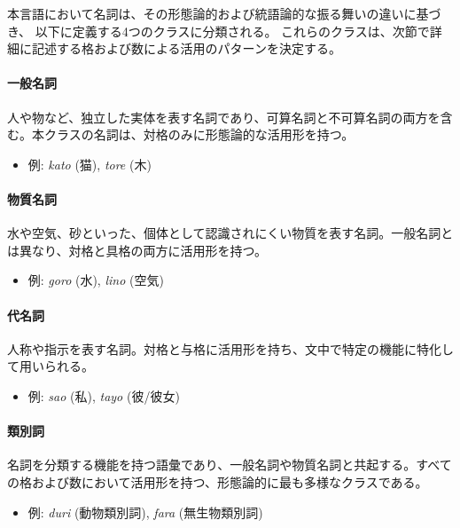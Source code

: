 本言語において名詞は、その形態論的および統語論的な振る舞いの違いに基づき、
以下に定義する4つのクラスに分類される。
これらのクラスは、次節で詳細に記述する格および数による活用のパターンを決定する。

\paragraph{一般名詞}
人や物など、独立した実体を表す名詞であり、可算名詞と不可算名詞の両方を含む。本クラスの名詞は、対格のみに形態論的な活用形を持つ。
\begin{itemize}
\item 例: \textit{kato} (猫), \textit{tore} (木)
\end{itemize}

\paragraph{物質名詞}
水や空気、砂といった、個体として認識されにくい物質を表す名詞。一般名詞とは異なり、対格と具格の両方に活用形を持つ。
\begin{itemize}
\item 例: \textit{goro} (水), \textit{lino} (空気)
\end{itemize}

\paragraph{代名詞}
人称や指示を表す名詞。対格と与格に活用形を持ち、文中で特定の機能に特化して用いられる。
\begin{itemize}
\item 例: \textit{sao} (私), \textit{tayo} (彼/彼女)
\end{itemize}

\paragraph{類別詞}
名詞を分類する機能を持つ語彙であり、一般名詞や物質名詞と共起する。すべての格および数において活用形を持つ、形態論的に最も多様なクラスである。
\begin{itemize}
\item 例: \textit{duri} (動物類別詞), \textit{fara} (無生物類別詞)
\end{itemize}
